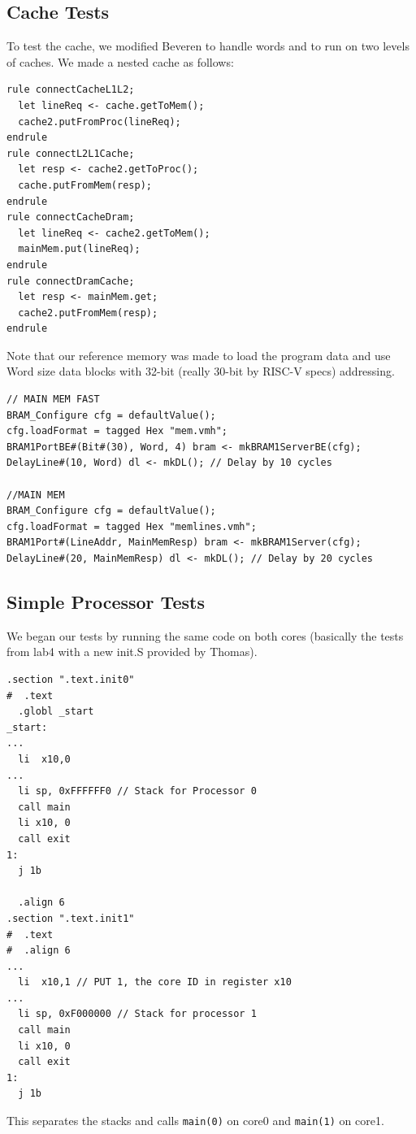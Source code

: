\documentclass{article}
\begin{document}
\subsection{Cache Tests}
To test the cache, we modified Beveren to handle words and to run on two levels of caches. We made a nested cache as follows:
\begin{lstlisting}
rule connectCacheL1L2;
  let lineReq <- cache.getToMem();
  cache2.putFromProc(lineReq);
endrule
rule connectL2L1Cache;
  let resp <- cache2.getToProc();
  cache.putFromMem(resp);
endrule
rule connectCacheDram;
  let lineReq <- cache2.getToMem();
  mainMem.put(lineReq);
endrule
rule connectDramCache;
  let resp <- mainMem.get;
  cache2.putFromMem(resp);
endrule
\end{lstlisting}
Note that our reference memory was made to load the program data and use Word size data blocks with 32-bit (really 30-bit by RISC-V specs) addressing.
\begin{lstlisting}
// MAIN MEM FAST
BRAM_Configure cfg = defaultValue();
cfg.loadFormat = tagged Hex "mem.vmh";
BRAM1PortBE#(Bit#(30), Word, 4) bram <- mkBRAM1ServerBE(cfg);
DelayLine#(10, Word) dl <- mkDL(); // Delay by 10 cycles

//MAIN MEM
BRAM_Configure cfg = defaultValue();
cfg.loadFormat = tagged Hex "memlines.vmh";
BRAM1Port#(LineAddr, MainMemResp) bram <- mkBRAM1Server(cfg);
DelayLine#(20, MainMemResp) dl <- mkDL(); // Delay by 20 cycles
\end{lstlisting}

\subsection{Simple Processor Tests}

We began our tests by running the same code on both cores (basically the tests from lab4 with a new init.S provided by Thomas).

\begin{lstlisting}[language=RSVAssembler]
.section ".text.init0"
#  .text
  .globl _start
_start:
...
  li  x10,0
...
  li sp, 0xFFFFFF0 // Stack for Processor 0
  call main
  li x10, 0
  call exit
1:
  j 1b

  .align 6
.section ".text.init1"
#  .text
#  .align 6
...
  li  x10,1 // PUT 1, the core ID in register x10
...
  li sp, 0xF000000 // Stack for processor 1
  call main
  li x10, 0
  call exit
1:
  j 1b
\end{lstlisting}

This separates the stacks and calls \lstinline|main(0)| on core0 and \lstinline|main(1)| on core1.
\end{document}
